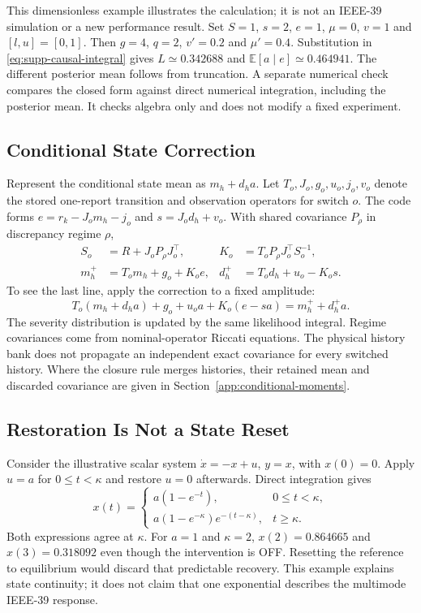 This dimensionless example illustrates the calculation; it is not an
IEEE-39 simulation or a new performance result. Set
$S=1$, $s=2$, $e=1$, $\mu=0$, $v=1$ and $[l,u]=[0,1]$.
Then $g=4$, $q=2$, $v'=0.2$ and $\mu'=0.4$. Substitution in
\eqref{eq:supp-causal-integral} gives
$L\simeq0.342688$ and
$\mathbb E[a\mid e]\simeq0.464941$.
The different posterior mean follows from truncation.
A separate numerical check compares the
closed form against direct numerical integration, including the posterior
mean. It checks algebra only and does not modify a fixed experiment.

\subsection{Conditional State Correction}
\label{sec:supp-causal-state}

Represent the conditional state mean as $m_h+d_h a$. Let
$T_o,J_o,g_o,u_o,j_o,v_o$ denote the stored one-report transition and
observation operators for switch $o$. The code forms
$e=r_k-J_o m_h-j_o$ and $s=J_o d_h+v_o$. With shared covariance
$P_\rho$ in discrepancy regime $\rho$,
\begin{align}
 S_o&=R+J_oP_\rho J_o^\top,&
 K_o&=T_oP_\rho J_o^\top S_o^{-1},\nonumber\\
 m_h^+&=T_o m_h+g_o+K_o e,&
 d_h^+&=T_o d_h+u_o-K_o s.
 \label{eq:implemented-conditional-correction}
\end{align}
To see the last line, apply the correction to a fixed amplitude:
\[
 T_o(m_h+d_h a)+g_o+u_o a+K_o(e-sa)
     =m_h^++d_h^+a.
\]
The severity distribution is updated by the same likelihood integral.
Regime covariances come from nominal-operator Riccati equations. The physical history bank does
not propagate an independent exact covariance for every switched history.
Where the closure rule merges histories, their retained mean and discarded
covariance are given in Section~\ref{app:conditional-moments}.

\subsection{Restoration Is Not a State Reset}

Consider the illustrative scalar system
$\dot x=-x+u$, $y=x$, with $x(0)=0$. Apply $u=a$ for
$0\le t<\kappa$ and restore $u=0$ afterwards. Direct integration gives
\begin{equation}
 x(t)=\begin{cases}
 a(1-e^{-t}),&0\le t<\kappa,\\
 a(1-e^{-\kappa})e^{-(t-\kappa)},&t\ge\kappa.
 \end{cases}
\end{equation}
Both expressions agree at $\kappa$. For $a=1$ and $\kappa=2$,
$x(2)=0.864665$ and $x(3)=0.318092$ even though the intervention is OFF.
Resetting the reference to equilibrium would discard that predictable
recovery. This example explains state continuity; it does not claim that
one exponential describes the multimode IEEE-39 response.


